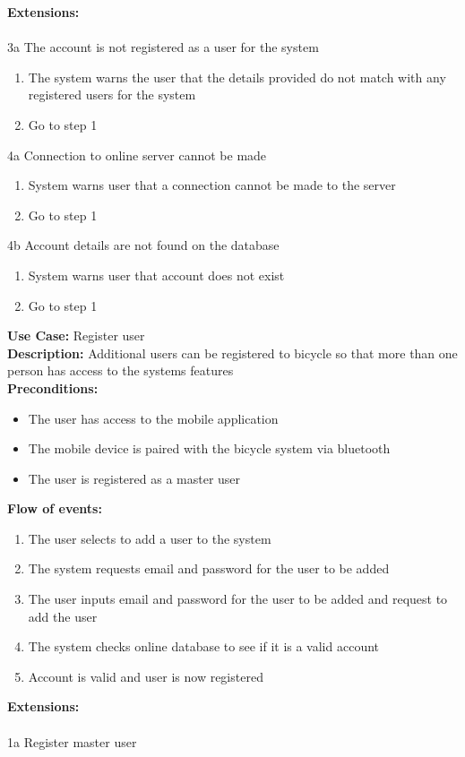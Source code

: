 \documentclass[a4paper]{report}
\begin{document}
\textbf{Extensions:} \\\\
3a The account is not registered as a user for the system
\begin{enumerate}
\item The system warns the user that the details provided do not match with any registered users for the system
\item Go to step 1
\end{enumerate}
4a Connection to online server cannot be made
\begin{enumerate}
\item System warns user that a connection cannot be made to the server
\item Go to step 1
\end{enumerate}
4b Account details are not found on the database
\begin{enumerate}
\item System warns user that account does not exist
\item Go to step 1
\end{enumerate}
\textbf{Use Case:} Register user\\
\textbf{Description:} Additional users can be registered to bicycle so that more than one person has access to the systems features\\
\textbf{Preconditions:} \begin{itemize}
\item The user has access to the mobile application
\item The mobile device is paired with the bicycle system via bluetooth
\item The user is registered as a master user
\end{itemize}
\textbf{Flow of events:} \begin{enumerate}
\item The user selects to add a user to the system
\item The system requests email and password for the user to be added
\item The user inputs email and password for the user to be added and request to add the user
\item The system checks online database to see if it is a valid account
\item Account is valid and user is now registered
\end{enumerate}
\textbf{Extensions:} \\\\
1a Register master user
\end{document}
